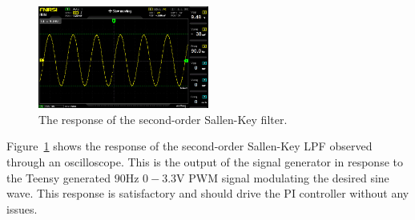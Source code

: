 \begin{figure}[h]
    \includegraphics[width=0.5\textwidth]{./figures/output_osc.jpg}
    \caption{The response of the second-order Sallen-Key filter.}
    \label{fig:sallenkey_osc}
\end{figure}

Figure~\ref{fig:sallenkey_osc} shows the response of the second-order Sallen-Key
LPF observed through an oscilloscope. This is the output of the signal generator
in response to the Teensy generated $90$\unit{\hertz} $0-3.3$\unit{\volt} PWM
signal modulating the desired sine wave. This response is satisfactory and
should drive the PI controller without any issues.
